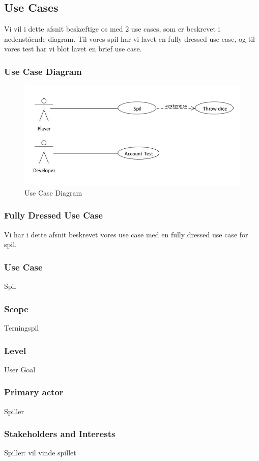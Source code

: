 \subsection{Use Cases}
Vi vil i dette afsnit beskæftige os med 2 use cases, som er beskrevet i nedenstående diagram. Til vores spil har vi lavet en fully dressed use case, og til vores test har vi blot lavet en brief use case.
\subsubsection{Use Case Diagram}
\begin{figure}[ht]
\centering
\includegraphics[scale=0.5]{UseCaseDiagram.jpg}
\caption[<Text for the list of figures>]{Use Case Diagram}
\label{fig:figure 2}
\end{figure}
\newpage
\subsubsection{Fully Dressed Use Case}
Vi har i dette afsnit beskrevet vores use case med en fully dressed use case for spil.
\subsubsection*{Use Case}
Spil
\subsubsection*{Scope}
Terningspil
\subsubsection*{Level}
User Goal
\subsubsection*{Primary actor}
Spiller
\subsubsection*{Stakeholders and Interests}
Spiller: vil vinde spillet
